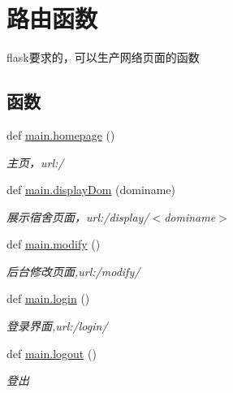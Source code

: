\hypertarget{group___xE8_xB7_xAF_xE7_x94_xB1_xE5_x87_xBD_xE6_x95_xB0}{}\section{路由函数}
\label{group___xE8_xB7_xAF_xE7_x94_xB1_xE5_x87_xBD_xE6_x95_xB0}


flask要求的，可以生产网络页面的函数  


\subsection*{函数}
\begin{DoxyCompactItemize}
\item 
def \mbox{\hyperlink{group___xE8_xB7_xAF_xE7_x94_xB1_xE5_x87_xBD_xE6_x95_xB0_gab78667d84f4fdf0575af2adb306417c4}{main.\+homepage}} ()
\begin{DoxyCompactList}\small\item\em 主页，url\+:\textquotesingle{}/\textquotesingle{} \end{DoxyCompactList}\item 
def \mbox{\hyperlink{group___xE8_xB7_xAF_xE7_x94_xB1_xE5_x87_xBD_xE6_x95_xB0_ga037a19c20276c539ad0c761b8d54e36f}{main.\+display\+Dom}} (dominame)
\begin{DoxyCompactList}\small\item\em 展示宿舍页面，url\+:\textquotesingle{}/display/$<$dominame$>$\textquotesingle{} \end{DoxyCompactList}\item 
def \mbox{\hyperlink{group___xE8_xB7_xAF_xE7_x94_xB1_xE5_x87_xBD_xE6_x95_xB0_gac7ef9122c03a3279b6d1d904f4a16150}{main.\+modify}} ()
\begin{DoxyCompactList}\small\item\em 后台修改页面,url\+:\textquotesingle{}/modify/\textquotesingle{} \end{DoxyCompactList}\item 
def \mbox{\hyperlink{group___xE8_xB7_xAF_xE7_x94_xB1_xE5_x87_xBD_xE6_x95_xB0_ga4a5118733a16e40bc747937152312ab0}{main.\+login}} ()
\begin{DoxyCompactList}\small\item\em 登录界面,url\+:\textquotesingle{}/login/\textquotesingle{} \end{DoxyCompactList}\item 
def \mbox{\hyperlink{group___xE8_xB7_xAF_xE7_x94_xB1_xE5_x87_xBD_xE6_x95_xB0_ga6065500a38cb05f19a9613bdc7ac05f1}{main.\+logout}} ()
\begin{DoxyCompactList}\small\item\em 登出 \end{DoxyCompactList}\item 

\end{DoxyCompactItemize}
